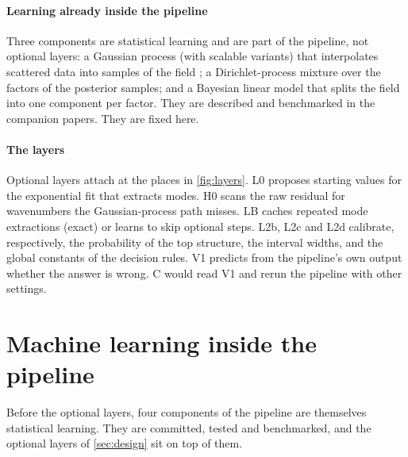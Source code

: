 \documentclass[11pt]{article}
\theoremstyle{plain}
\theoremstyle{definition}
\theoremstyle{remark}
\begin{document}
\paragraph{Learning already inside the pipeline} Three components are statistical learning and are part of the pipeline,
not optional layers: a Gaussian process (with scalable variants) that interpolates scattered data into samples of the field
\cite{RasWil06}; a Dirichlet-process mixture over the factors of the posterior samples; and a Bayesian linear model that
splits the field into one component per factor. They are described and benchmarked in the companion papers. They are
fixed here.

\paragraph{The layers} Optional layers attach at the places in \cref{fig:layers}. L0 proposes starting values for the
exponential fit that extracts modes. H0 scans the raw residual for wavenumbers the Gaussian-process path misses. LB caches
repeated mode extractions (exact) or learns to skip optional steps. L2b, L2c and L2d calibrate, respectively, the
probability of the top structure, the interval widths, and the global constants of the decision rules. V1 predicts from the
pipeline's own output whether the answer is wrong. C would read V1 and rerun the pipeline with other settings.


\section{Machine learning inside the pipeline}\label{sec:inside-ml}
Before the optional layers, four components of the pipeline are themselves statistical learning. They are committed, tested and benchmarked, and the optional layers of \cref{sec:design} sit on top of them.
\end{document}

